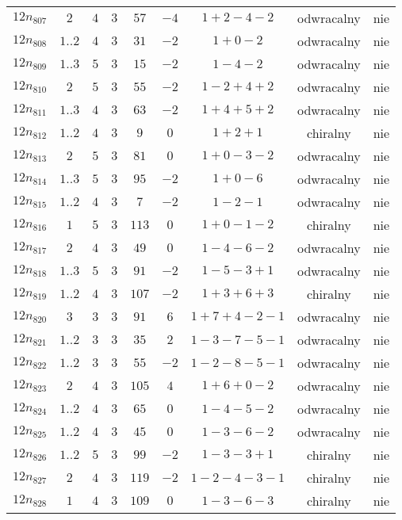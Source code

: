 \begin{longtable}{ccccccccc}
$12n_{807}$ & $2$ & $4$ & $3$ & $57$ & $-4$ & $1+2-4-2$ & odwracalny & nie \\
$12n_{808}$ & $1..2$ & $4$ & $3$ & $31$ & $-2$ & $1+0-2$ & odwracalny & nie \\
$12n_{809}$ & $1..3$ & $5$ & $3$ & $15$ & $-2$ & $1-4-2$ & odwracalny & nie \\
$12n_{810}$ & $2$ & $5$ & $3$ & $55$ & $-2$ & $1-2+4+2$ & odwracalny & nie \\
$12n_{811}$ & $1..3$ & $4$ & $3$ & $63$ & $-2$ & $1+4+5+2$ & odwracalny & nie \\
$12n_{812}$ & $1..2$ & $4$ & $3$ & $9$ & $0$ & $1+2+1$ & chiralny & nie \\
$12n_{813}$ & $2$ & $5$ & $3$ & $81$ & $0$ & $1+0-3-2$ & odwracalny & nie \\
$12n_{814}$ & $1..3$ & $5$ & $3$ & $95$ & $-2$ & $1+0-6$ & odwracalny & nie \\
$12n_{815}$ & $1..2$ & $4$ & $3$ & $7$ & $-2$ & $1-2-1$ & odwracalny & nie \\
$12n_{816}$ & $1$ & $5$ & $3$ & $113$ & $0$ & $1+0-1-2$ & chiralny & nie \\
$12n_{817}$ & $2$ & $4$ & $3$ & $49$ & $0$ & $1-4-6-2$ & odwracalny & nie \\
$12n_{818}$ & $1..3$ & $5$ & $3$ & $91$ & $-2$ & $1-5-3+1$ & odwracalny & nie \\
$12n_{819}$ & $1..2$ & $4$ & $3$ & $107$ & $-2$ & $1+3+6+3$ & chiralny & nie \\
$12n_{820}$ & $3$ & $3$ & $3$ & $91$ & $6$ & $1+7+4-2-1$ & odwracalny & nie \\
$12n_{821}$ & $1..2$ & $3$ & $3$ & $35$ & $2$ & $1-3-7-5-1$ & odwracalny & nie \\
$12n_{822}$ & $1..2$ & $3$ & $3$ & $55$ & $-2$ & $1-2-8-5-1$ & odwracalny & nie \\
$12n_{823}$ & $2$ & $4$ & $3$ & $105$ & $4$ & $1+6+0-2$ & odwracalny & nie \\
$12n_{824}$ & $1..2$ & $4$ & $3$ & $65$ & $0$ & $1-4-5-2$ & odwracalny & nie \\
$12n_{825}$ & $1..2$ & $4$ & $3$ & $45$ & $0$ & $1-3-6-2$ & odwracalny & nie \\
$12n_{826}$ & $1..2$ & $5$ & $3$ & $99$ & $-2$ & $1-3-3+1$ & chiralny & nie \\
$12n_{827}$ & $2$ & $4$ & $3$ & $119$ & $-2$ & $1-2-4-3-1$ & chiralny & nie \\
$12n_{828}$ & $1$ & $4$ & $3$ & $109$ & $0$ & $1-3-6-3$ & chiralny & nie \\

\end{longtable}
